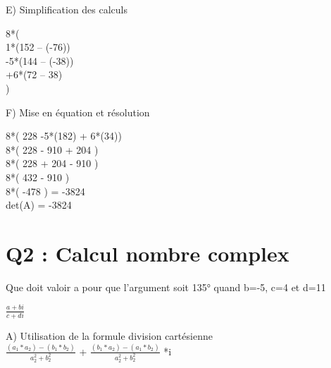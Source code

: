 E) Simplification des calculs

\vspace{5mm} %

8*(\\

  1*(152 – (-76))\\

  -5*(144 – (-38))\\

  +6*(72 – 38)\\

)

\vspace{10mm} %


F) Mise en équation et résolution \\

\vspace{5mm} %

8*( 228 -5*(182) + 6*(34))\\

8*( 228 - 910 + 204 )\\

8*( 228 + 204 - 910 )\\

8*( 432 - 910 )\\

8*( -478 ) = -3824\\

det(A) = -3824\\


\newpage

\section{Q2 : Calcul nombre complex}

\vspace{4mm} %

Que doit valoir a pour que l’argument soit 135° quand b=-5, c=4 et d=11 \\

\vspace{4mm} %

$
\frac{a+bi}{c+di}
$

\vspace{10mm} %

A) Utilisation de la formule division cartésienne\\

$\frac{(a_1 * a_2) - (b_1*b_2)} {a_{2}^{2}+b_{2}^{2} } $ + $\frac{(b_1 * a_2) - (a_1*b_2)} {a_{2}^{2}+b_{2}^{2} } $ *i \\

